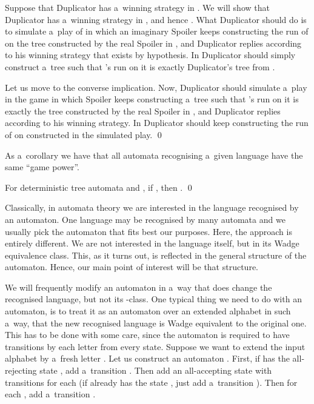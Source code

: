 \documentclass{LMCS}
\begin{document}
Suppose that Duplicator has a~winning strategy in . We will show that Duplicator has a~winning strategy in , and hence . What Duplicator should do is to simulate a~play of  in which an imaginary Spoiler keeps constructing the run of  on the tree  constructed by the real Spoiler in , and Duplicator replies according to his winning strategy that exists by hypothesis. In  Duplicator should simply construct a~tree such that 's run on it is exactly Duplicator's tree from . 

Let us move to the converse implication. Now, Duplicator should simulate a~play in the game  in which Spoiler keeps constructing a~tree such that 's run on it is exactly the tree constructed by the real Spoiler in , and Duplicator replies according to his winning strategy. In  Duplicator should keep constructing the run of  on  constructed in the simulated play.  \qed

\vspace{5pt}

As a~corollary we have that all automata recognising a~given language have the same ``game power''. 

\begin{cor} 
For deterministic tree automata  and , if , then . \qed
\end{cor}

Classically, in automata theory we are interested in the language recognised by an automaton. One language may be recognised by many automata and we usually pick the automaton that fits best our purposes. Here, the approach is entirely different. We are not interested in the language itself, but in its Wadge equivalence class. This, as it turns out, is reflected in the general structure of the automaton. Hence, our main point of interest will be that structure. 

We will frequently modify an automaton in a~way that does change the
recognised language, but not its -class. One typical thing we need to do with an automaton, is to treat it as an automaton over an extended alphabet in such a~way, that the new recognised language is Wadge equivalent to the original one. This has to be done with some care, since the automaton is required to have transitions by each letter from every state.  Suppose we want to extend the input alphabet \label{extalphabet} by a~fresh letter . Let us construct an automaton . First, if  has the all-rejecting state , add a~transition . Then add an all-accepting state  with transitions  for each  (if  already has the state , just add a~transition ). Then for each , add a~transition . 
\end{document}
